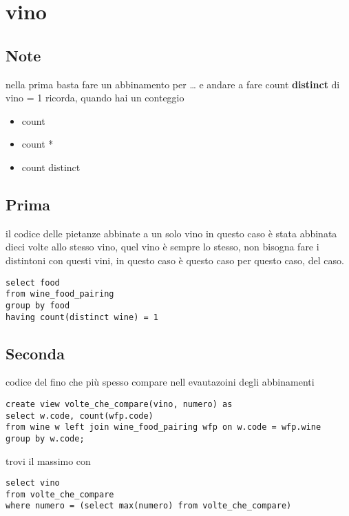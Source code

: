 \documentclass[11pt]{article}
\author{Biggus Diccus}
\date{\today}
\title{}
\begin{document}
\tableofcontents

\section{vino}
\label{sec:org334d11d}
\subsection{Note}
\label{sec:org755696c}
nella prima basta fare un abbinamento per \ldots{}
e andare a fare count \textbf{distinct} di vino = 1
ricorda, quando hai un conteggio
\begin{itemize}
\item count
\item count *
\item count distinct
\end{itemize}

\subsection{Prima}
\label{sec:org7703864}
il codice delle pietanze abbinate a un solo vino
in questo caso è stata abbinata dieci volte allo stesso vino, quel vino è sempre lo
stesso, non bisogna fare i distintoni con questi vini, in questo caso è questo caso per
questo caso, del caso.

\begin{verbatim}
select food
from wine_food_pairing
group by food
having count(distinct wine) = 1

\end{verbatim}

\subsection{Seconda}
\label{sec:org60f75c6}
codice del fino che più spesso compare nell evautazoini degli abbinamenti

\begin{verbatim}
create view volte_che_compare(vino, numero) as
select w.code, count(wfp.code)
from wine w left join wine_food_pairing wfp on w.code = wfp.wine
group by w.code;
\end{verbatim}

trovi il massimo con

\begin{verbatim}
select vino
from volte_che_compare
where numero = (select max(numero) from volte_che_compare)
\end{verbatim}
\end{document}
